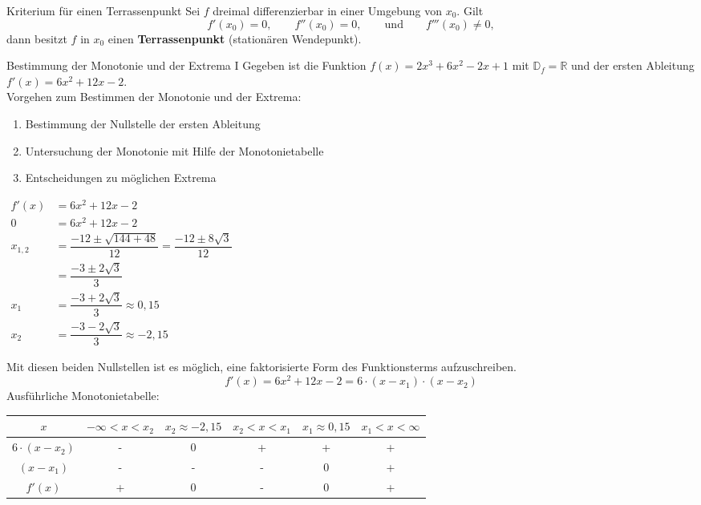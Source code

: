   \begin{satz}{Kriterium für einen Terrassenpunkt}{}
Sei \(f\) dreimal differenzierbar in einer Umgebung von \(x_0\).
Gilt
\[
f'(x_0)=0,\qquad f''(x_0)=0,\qquad \text{und}\qquad f'''(x_0)\neq 0,
\]
dann besitzt \(f\) in \(x_0\) einen \textbf{Terrassenpunkt} (stationären Wendepunkt).
\end{satz}
 \begin{bsp}{Bestimmung der Monotonie und der Extrema I}{}
 Gegeben ist die Funktion $f(x) = 2x^3 +6x^2 -2x + 1$ mit $\mathds{D}_f = \mathds{R}$ und der ersten Ableitung $f'(x) = 6x^2+12x-2$.\\
 Vorgehen zum Bestimmen der Monotonie und der Extrema:
 \begin{enumerate}
     \item Bestimmung der Nullstelle der ersten Ableitung
     \item Untersuchung der Monotonie mit Hilfe der Monotonietabelle
     \item Entscheidungen zu möglichen Extrema
 \end{enumerate}
 \begin{center}$\begin{aligned}
	f'(x)&= 6x^2+12x-2\\
    0 &= 6x^2+12x-2\\
    x_{1,2} &= \dfrac{-12 \pm \sqrt{144 +48} }{12} = \dfrac{-12\pm 8\sqrt{3}}{12}\\
    &= \dfrac{-3\pm 2\sqrt{3}}{3}\\
    x_1&= \dfrac{-3+ 2\sqrt{3}}{3}\approx 0,15\\
    x_2&= \dfrac{-3 - 2\sqrt{3}}{3}\approx -2,15
	\end{aligned}$\end{center}
 Mit diesen beiden Nullstellen ist es möglich, eine faktorisierte Form des Funktionsterms aufzuschreiben. $$f'(x)= 6x^2+12x-2 = 6\cdot \left(x-x_1 \right)\cdot \left(x-x_2 \right)$$
Ausführliche Monotonietabelle:\\
\begin{center}\begin{tabular}{||c|c|c|c|c|c||}
    \hline
    $x$& $ -\infty <x<x_2 $ & $ x_2 \approx -2,15$ &$ x_2<x<x_1 $ & $x_1 \approx 0,15 $& $ x_1<x<\infty $\\
    \hline \hline
    $6\cdot (x-x_2)$ & - &  0 & + & + & +  \\
    \hline
    $(x -x_1)$ & - & - & - &0 & + \\
    \hline
    $f'(x)$ & + & 0 & - & 0 & +\\ 

\end{tabular}
\end{center}
\end{bsp}
